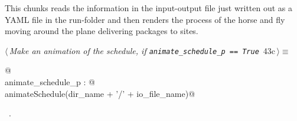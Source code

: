 \documentclass[11.5pt]{report}
\begin{document}
\vspace{-0.8cm} \newchunk This chunks reads the information in the input-output file just written out as
a YAML file in the run-folder and then renders the process of the horse and fly moving around the plane 
delivering packages to sites. 

\begin{flushleft} \small
\begin{minipage}{\linewidth}\label{scrap63}\raggedright\small
{} $\langle\,${\itshape Make an animation of the schedule, if \verb|animate_schedule_p == True|}\nobreak\ {\footnotesize {43c}}$\,\rangle\equiv$
\vspace{-1ex}
\begin{list}{}{} \item
\mbox{}\verb@   @\\
\mbox{}\verb@if animate_schedule_p : @\\
\mbox{}\verb@     animateSchedule(dir_name + '/' + io_file_name)@\\
\mbox{}\verb@@{\NWsep}
\end{list}
\vspace{-1.5ex}
\footnotesize
\begin{list}{}{\setlength{\itemsep}{-\parsep}\setlength{\itemindent}{-\leftmargin}}
\item \NWtxtMacroRefIn\ .

\item{}
\end{list}
\end{minipage}\vspace{4ex}
\end{flushleft}

\vspace{-0.8cm}\newchunk 
\end{document}
